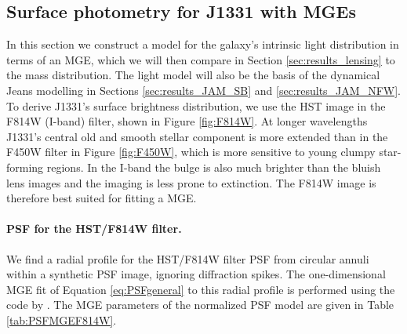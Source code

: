 \subsection{Surface photometry for J1331 with MGEs} \label{sec:MGE_results}

In this section we construct a model for the galaxy's intrinsic light distribution in terms of an MGE, which we will then compare in Section \ref{sec:results_lensing} to the mass distribution. The light model will also be the basis of the dynamical Jeans modelling in Sections \ref{sec:results_JAM_SB} and \ref{sec:results_JAM_NFW}.
\\To derive J1331's surface brightness distribution, we use the HST image in the F814W (I-band) filter, shown in Figure \ref{fig:F814W}. At longer wavelengths J1331's central old and smooth stellar component is more extended than in the F450W filter in Figure \ref{fig:F450W}, which is more sensitive to young clumpy star-forming regions. In the I-band the bulge is also much brighter than the bluish lens images and the imaging is less prone to extinction. The F814W image is therefore best suited for fitting a MGE. 

\paragraph{PSF for the HST/F814W filter.} We find a radial profile for the HST/F814W filter PSF from circular annuli within a synthetic PSF image, ignoring diffraction spikes. The one-dimensional MGE fit of Equation \ref{eq:PSFgeneral} to this radial profile is performed using the code by \citet{Cap02}. The MGE parameters of the normalized PSF model are given in Table \ref{tab:PSFMGEF814W}.

